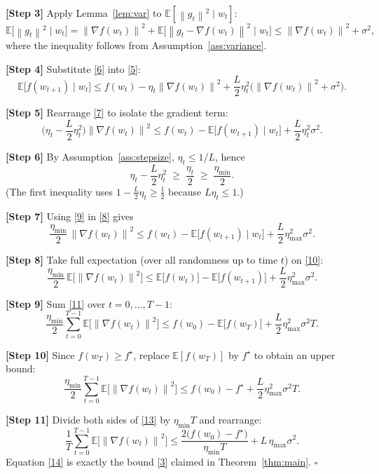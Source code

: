 \documentclass{article}
\newcommand{\E}{\mathbb{E}}
\newcommand{\norm}[1]{\left\| #1 \right\|}
\begin{document}
\noindent\textbf{[Step 3]} Apply Lemma~\ref{lem:var} to $\E[\norm{g_t}^{2}\mid w_t]$:
\[
\E\!\big[\norm{g_t}^{2}\mid w_t\big]
= \norm{\nabla f(w_t)}^{2}
+ \E\!\big[\norm{g_t-\nabla f(w_t)}^{2}\mid w_t\big]
\le \norm{\nabla f(w_t)}^{2}+\sigma^{2},
\tag{6}
\]
where the inequality follows from Assumption~\ref{ass:variance}.

\noindent\textbf{[Step 4]} Substitute \eqref{6} into \eqref{5}:
\[
\E\!\big[f(w_{t+1})\mid w_t\big]\le
f(w_t)-\eta_t\norm{\nabla f(w_t)}^{2}
+\frac{L}{2}\eta_t^{2}\big(\norm{\nabla f(w_t)}^{2}+\sigma^{2}\big).
\tag{7}
\]

\noindent\textbf{[Step 5]} Rearrange \eqref{7} to isolate the gradient term:
\[
\Big(\eta_t-\frac{L}{2}\eta_t^{2}\Big)\norm{\nabla f(w_t)}^{2}
\le f(w_t)-\E\!\big[f(w_{t+1})\mid w_t\big]
+\frac{L}{2}\eta_t^{2}\sigma^{2}.
\tag{8}
\]

\noindent\textbf{[Step 6]} By Assumption~\ref{ass:stepsize}, $\eta_t\le 1/L$, hence
\[
\eta_t-\frac{L}{2}\eta_t^{2}
\;\ge\; \frac{\eta_t}{2}
\;\ge\; \frac{\eta_{\min}}{2}.
\tag{9}
\]
(The first inequality uses $1-\frac{L}{2}\eta_t\ge\frac12$ because $L\eta_t\le1$.)

\noindent\textbf{[Step 7]} Using \eqref{9} in \eqref{8} gives
\[
\frac{\eta_{\min}}{2}\,\norm{\nabla f(w_t)}^{2}
\le f(w_t)-\E\!\big[f(w_{t+1})\mid w_t\big]
+\frac{L}{2}\eta_{\max}^{2}\sigma^{2}.
\tag{10}
\]

\noindent\textbf{[Step 8]} Take full expectation (over all randomness up to time $t$) on \eqref{10}:
\[
\frac{\eta_{\min}}{2}\,\E\!\big[\norm{\nabla f(w_t)}^{2}\big]
\le \E\!\big[f(w_t)\big]-\E\!\big[f(w_{t+1})\big]
+\frac{L}{2}\eta_{\max}^{2}\sigma^{2}.
\tag{11}
\]

\noindent\textbf{[Step 9]} Sum \eqref{11} over $t=0,\dots,T-1$:
\[
\frac{\eta_{\min}}{2}\sum_{t=0}^{T-1}\E\!\big[\norm{\nabla f(w_t)}^{2}\big]
\le f(w_0)-\E\!\big[f(w_T)\big]
+\frac{L}{2}\eta_{\max}^{2}\sigma^{2}T .
\tag{12}
\]

\noindent\textbf{[Step 10]} Since $f(w_T)\ge f^{\star}$, replace $\E[f(w_T)]$ by $f^{\star}$ to obtain an upper bound:
\[
\frac{\eta_{\min}}{2}\sum_{t=0}^{T-1}\E\!\big[\norm{\nabla f(w_t)}^{2}\big]
\le f(w_0)-f^{\star}
+\frac{L}{2}\eta_{\max}^{2}\sigma^{2}T .
\tag{13}
\]

\noindent\textbf{[Step 11]} Divide both sides of \eqref{13} by $\eta_{\min}T$ and rearrange:
\[
\frac1T\sum_{t=0}^{T-1}\E\!\big[\norm{\nabla f(w_t)}^{2}\big]
\le
\frac{2\big(f(w_0)-f^{\star}\big)}{\eta_{\min}T}
+L\,\eta_{\max}\sigma^{2}.
\tag{14}
\]
Equation \eqref{14} is exactly the bound \eqref{3} claimed in Theorem~\ref{thm:main}.  $\square$
\end{document}
